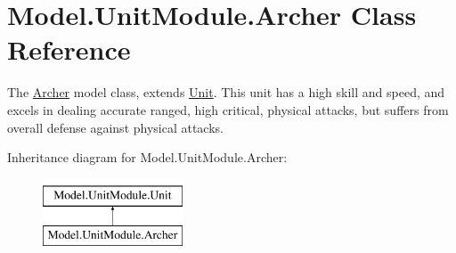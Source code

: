 \hypertarget{class_model_1_1_unit_module_1_1_archer}{}\section{Model.\+Unit\+Module.\+Archer Class Reference}
\label{class_model_1_1_unit_module_1_1_archer}


The \hyperlink{class_model_1_1_unit_module_1_1_archer}{Archer} model class, extends \hyperlink{interface_model_1_1_unit_module_1_1_unit}{Unit}. This unit has a high skill and speed, and excels in dealing accurate ranged, high critical, physical attacks, but suffers from overall defense against physical attacks.  


Inheritance diagram for Model.\+Unit\+Module.\+Archer\+:\begin{figure}[H]
\begin{center}
\leavevmode
\includegraphics[height=2.000000cm]{class_model_1_1_unit_module_1_1_archer}
\end{center}
\end{figure}
